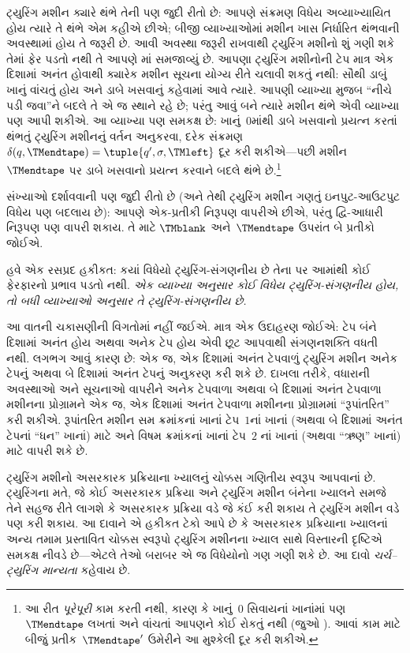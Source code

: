 ટ્યુરિંગ મશીન ક્યારે થંભે તેની પણ જુદી રીતો છે: આપણે
સંક્રમણ વિધેય અવ્યાખ્યાયિત હોય ત્યારે તે થંભે એમ કહીએ
છીએ; બીજી વ્યાખ્યાઓમાં મશીન ખાસ નિર્ધારિત થંભવાની
અવસ્થામાં હોય તે જરૂરી છે. આવી અવસ્થા જરૂરી રાખવાથી
ટ્યુરિંગ મશીનો શું ગણી શકે તેમાં ફેર પડતો નથી તે આપણે
માં સમજાવ્યું છે. આપણા ટ્યુરિંગ મશીનોની
ટેપ માત્ર એક દિશામાં અનંત હોવાથી ક્યારેક મશીન સૂચના
યોગ્ય રીતે ચલાવી શકતું નથી: સૌથી ડાબું ખાનું વાંચતું
હોય અને ડાબે ખસવાનું કહેવામાં આવે ત્યારે. આપણી
વ્યાખ્યા મુજબ ``નીચે પડી જવા''ને બદલે તે એ જ સ્થાને
રહે છે; પરંતુ આવું બને ત્યારે મશીન થંભે એવી વ્યાખ્યા
પણ આપી શકીએ. આ વ્યાખ્યા પણ સમકક્ષ છે: ખાનું~$0$માંથી
ડાબે ખસવાનો પ્રયત્ન કરતાં થંભતું ટ્યુરિંગ મશીનનું વર્તન
અનુકરવા, દરેક સંક્રમણ $\delta(q,\TMendtape) =
\tuple{q',\sigma,\TMleft}$ દૂર કરી શકીએ---પછી
મશીન~$\TMendtape$ પર ડાબે ખસવાનો પ્રયત્ન કરવાને
બદલે થંભે છે.\footnote{આ રીત \emph{પૂરેપૂરી} કામ
કરતી નથી, કારણ કે ખાનું~$0$ સિવાયનાં ખાનાંમાં પણ
$\TMendtape$ લખતાં અને વાંચતાં આપણને કોઈ રોકતું નથી
(જુઓ ). આવાં કામ માટે બીજું
પ્રતીક~$\TMendtape'$ ઉમેરીને આ મુશ્કેલી દૂર કરી શકીએ.}

સંખ્યાઓ દર્શાવવાની પણ જુદી રીતો છે (અને તેથી ટ્યુરિંગ
મશીન ગણતું ઇનપુટ-આઉટપુટ વિધેય પણ બદલાય છે): આપણે
એક-પ્રતીકી નિરૂપણ વાપરીએ છીએ, પરંતુ દ્વિ-આધારી
નિરૂપણ પણ વાપરી શકાય. તે માટે $\TMblank$ અને~$\TMendtape$
ઉપરાંત બે પ્રતીકો જોઈએ.

હવે એક રસપ્રદ હકીકત: કયાં વિધેયો ટ્યુરિંગ-સંગણનીય છે
તેના પર આમાંથી કોઈ ફેરફારનો પ્રભાવ પડતો નથી.
\emph{એક વ્યાખ્યા અનુસાર કોઈ વિધેય ટ્યુરિંગ-સંગણનીય
હોય, તો બધી વ્યાખ્યાઓ અનુસાર તે ટ્યુરિંગ-સંગણનીય છે.}

આ વાતની ચકાસણીની વિગતોમાં નહીં જઈએ. માત્ર એક
ઉદાહરણ જોઈએ: ટેપ બંને દિશામાં અનંત હોય અથવા
અનેક ટેપ હોય એવી છૂટ આપવાથી સંગણનશક્તિ વધતી
નથી. લગભગ આવું કારણ છે: એક જ, એક દિશામાં
અનંત ટેપવાળું ટ્યુરિંગ મશીન અનેક ટેપનું અથવા બે
દિશામાં અનંત ટેપનું અનુકરણ કરી શકે છે. દાખલા તરીકે,
વધારાની અવસ્થાઓ અને સૂચનાઓ વાપરીને અનેક ટેપવાળા
અથવા બે દિશામાં અનંત ટેપવાળા મશીનના પ્રોગ્રામને
એક જ, એક દિશામાં અનંત ટેપવાળા મશીનના પ્રોગ્રામમાં
``રૂપાંતરિત'' કરી શકીએ. રૂપાંતરિત મશીન સમ ક્રમાંકનાં
ખાનાં ટેપ~$1$નાં ખાનાં (અથવા બે દિશામાં અનંત ટેપનાં
``ધન'' ખાનાં) માટે અને વિષમ ક્રમાંકનાં ખાનાં ટેપ~$2$
નાં ખાનાં (અથવા ``ઋણ'' ખાનાં) માટે વાપરી શકે છે.
\endgroup


\begingroup
\makeatletter{}\makeatother

\label{guunit:OLP-0263}


ટ્યુરિંગ મશીનો અસરકારક પ્રક્રિયાના ખ્યાલનું ચોક્કસ
ગણિતીય સ્વરૂપ આપવાનાં છે. ટ્યુરિંગના મતે, જે કોઈ
અસરકારક પ્રક્રિયા અને ટ્યુરિંગ મશીન બંનેના ખ્યાલને
સમજે તેને સહજ રીતે લાગશે કે અસરકારક પ્રક્રિયા વડે
જે કંઈ કરી શકાય તે ટ્યુરિંગ મશીન વડે પણ કરી શકાય.
આ દાવાને એ હકીકત ટેકો આપે છે કે અસરકારક પ્રક્રિયાના
ખ્યાલનાં અન્ય તમામ પ્રસ્તાવિત ચોક્કસ સ્વરૂપો ટ્યુરિંગ
મશીનના ખ્યાલ સાથે વિસ્તારની દૃષ્ટિએ સમકક્ષ નીવડે
છે---એટલે તેઓ બરાબર એ જ વિધેયોનો ગણ ગણી શકે છે.
આ દાવો \emph{ચર્ચ--ટ્યુરિંગ માન્યતા} કહેવાય છે.

